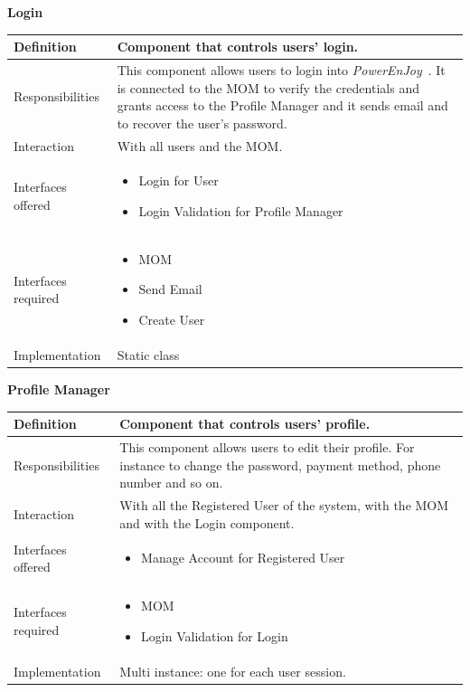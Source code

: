\documentclass{article}
\newcommand{\pej}{\mbox{\normalfont\itshape PowerEnJoy }}
\begin{document}
			\pagebreak
			\begin{center}
				\centerline{\textbf{Login}}	
				\begin{tabular}{| l | p{9cm} |}\hline
					Definition & Component that controls users' login.\\\hline
					Responsibilities & This component allows users to login into \pej{}. It is connected to the MOM to verify the credentials and grants access to the Profile Manager and it sends email and to recover the user's password.\\\hline
					Interaction & With all users and the MOM.\\\hline
					Interfaces offered & \begin{itemize}
						\item Login for User
						\item Login Validation for Profile Manager
					\end{itemize}\\\hline
					Interfaces required & \begin{itemize}
						\item MOM
						\item Send Email
						\item Create User
					\end{itemize}\\\hline
					Implementation & Static class\\\hline
				\end{tabular}
			\end{center}
			\begin{center}
				\centerline{\textbf{Profile Manager}}	
				\begin{tabular}{| l | p{9cm} |}\hline
					Definition & Component that controls users' profile.\\\hline
					Responsibilities & This component allows users to edit their profile. For instance to change the password, payment method, phone number and so on.\\\hline
					Interaction & With all the Registered User of the system, with the MOM and with the Login component.\\\hline
					Interfaces offered & \begin{itemize}
						\item Manage Account for Registered User
					\end{itemize}\\\hline
					Interfaces required & \begin{itemize}
						\item MOM
						\item Login Validation for Login
					\end{itemize}\\\hline
					Implementation & Multi instance: one for each user session.\\\hline
				\end{tabular}
			\end{center}
		
\end{document}
